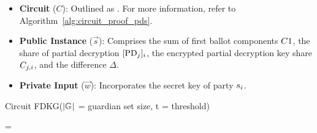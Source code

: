 \documentclass[runningheads]{llncs}
\begin{document}
\subsubsection{}\label{sec:proof-pds}

\begin{itemize}
    \item \textbf{Circuit} ($C$): Outlined as \ProofPDSInformal{}. For more information, refer to Algorithm~\ref{alg:circuit_proof_pds}.
    \item \textbf{Public Instance} ($\vec{s}$): Comprises the sum of first ballot components $C1{}$, the share of partial decryption $[\mathrm{PD}_{j}]_{i}$, the encrypted partial decryption key share $C_{j,i}$, and the difference $\Delta$.
    \item \textbf{Private Input} ($\vec{w}$): Incorporates the secret key of party $s_{i}$.
\end{itemize}


\begin{algorithm}
\caption{Circuit FDKG($|\mathbb{G}_{}|$ = guardian set size, t = threshold)}
\label{alg:circuit_fdkg}






\BlankLine

\Assert {} = \;

\end{algorithm}
\end{document}
